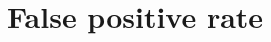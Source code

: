\documentclass[ ../main.tex]{subfiles}
\begin{document}
\section{False positive rate}
\end{document}
